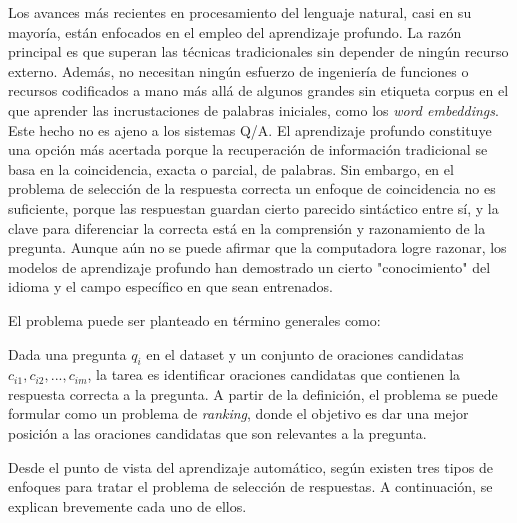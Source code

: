 Los avances más recientes en procesamiento del lenguaje natural, casi en su mayoría, están enfocados en el empleo del aprendizaje profundo. La razón principal es que superan las técnicas tradicionales sin depender de ningún recurso externo. Además, no necesitan ningún esfuerzo de ingeniería de funciones o recursos codificados a mano más allá de algunos grandes sin etiqueta corpus en el que aprender las incrustaciones de palabras iniciales, como los \textit{word embeddings}. Este hecho no es ajeno a los sistemas Q/A. El aprendizaje profundo constituye una opción más acertada porque la recuperación de información tradicional se basa en la coincidencia, exacta o parcial, de palabras. Sin embargo, en el problema de selección de la respuesta correcta un enfoque de coincidencia no es suficiente, porque las respuestan guardan cierto parecido sintáctico entre sí, y la clave para diferenciar la correcta está en la comprensión y razonamiento de la pregunta. Aunque aún no se puede afirmar que la computadora logre razonar, los modelos de aprendizaje profundo han demostrado un cierto "conocimiento" del idioma y el campo específico en que sean entrenados.

El problema puede ser planteado en término generales como: 

Dada una pregunta $q_{i}$ en el dataset y un conjunto de oraciones candidatas ${c_{i1}, c_{i2}, ..., c_{im}}$, la tarea es identificar oraciones candidatas que contienen
la respuesta correcta a la pregunta. A partir de la definición, el problema se puede formular como un problema de \textit{ranking}, donde el objetivo es dar una mejor posición a las oraciones candidatas que son relevantes a la pregunta.

Desde el punto de vista del aprendizaje automático, según \cite{2018-lai-review} existen tres tipos de enfoques para tratar el problema de selección de respuestas. A continuación, se explican brevemente cada uno de ellos.

